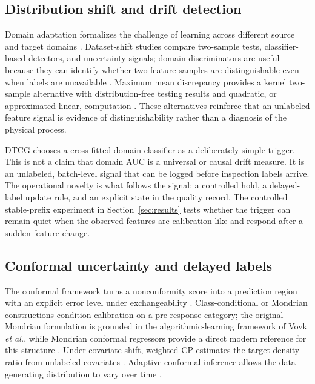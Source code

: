 \documentclass[journal]{IEEEtran}
\begin{document}
\subsection{Distribution shift and drift detection}
Domain adaptation formalizes the challenge of learning across different source and target domains \cite{ben2010}. Dataset-shift studies compare two-sample tests, classifier-based detectors, and uncertainty signals; domain discriminators are useful because they can identify whether two feature samples are distinguishable even when labels are unavailable \cite{rabanser2019,ovadia2019}. Maximum mean discrepancy provides a kernel two-sample alternative with distribution-free testing results and quadratic, or approximated linear, computation \cite{gretton2012}. These alternatives reinforce that an unlabeled feature signal is evidence of distinguishability rather than a diagnosis of the physical process.

DTCG chooses a cross-fitted domain classifier as a deliberately simple trigger. This is not a claim that domain AUC is a universal or causal drift measure. It is an unlabeled, batch-level signal that can be logged before inspection labels arrive. The operational novelty is what follows the signal: a controlled hold, a delayed-label update rule, and an explicit state in the quality record. The controlled stable-prefix experiment in Section~\ref{sec:results} tests whether the trigger can remain quiet when the observed features are calibration-like and respond after a sudden feature change.

\subsection{Conformal uncertainty and delayed labels}
The conformal framework turns a nonconformity score into a prediction region with an explicit error level under exchangeability \cite{vovk2005,shafer2008,angelopoulos2023}. Class-conditional or Mondrian constructions condition calibration on a pre-response category; the original Mondrian formulation is grounded in the algorithmic-learning framework of Vovk \emph{et al.}, while Mondrian conformal regressors provide a direct modern reference for this structure \cite{vovk2005,bostrom2020}. Under covariate shift, weighted CP estimates the target density ratio from unlabeled covariates \cite{tibshirani2019}. Adaptive conformal inference allows the data-generating distribution to vary over time \cite{gibbs2021}.
\end{document}
